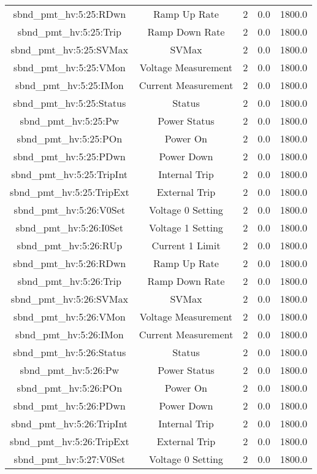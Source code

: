 \begin{center}
\begin{longtable}{c | c c c c }
sbnd\_pmt\_hv:5:25:RDwn & Ramp Up Rate & 2 & 0.0 & 1800.0\\ 
sbnd\_pmt\_hv:5:25:Trip & Ramp Down Rate & 2 & 0.0 & 1800.0\\ 
sbnd\_pmt\_hv:5:25:SVMax & SVMax & 2 & 0.0 & 1800.0\\ 
sbnd\_pmt\_hv:5:25:VMon & Voltage Measurement & 2 & 0.0 & 1800.0\\ 
sbnd\_pmt\_hv:5:25:IMon & Current Measurement & 2 & 0.0 & 1800.0\\ 
sbnd\_pmt\_hv:5:25:Status & Status & 2 & 0.0 & 1800.0\\ 
sbnd\_pmt\_hv:5:25:Pw & Power Status & 2 & 0.0 & 1800.0\\ 
sbnd\_pmt\_hv:5:25:POn & Power On & 2 & 0.0 & 1800.0\\ 
sbnd\_pmt\_hv:5:25:PDwn & Power Down & 2 & 0.0 & 1800.0\\ 
sbnd\_pmt\_hv:5:25:TripInt & Internal Trip & 2 & 0.0 & 1800.0\\ 
sbnd\_pmt\_hv:5:25:TripExt & External Trip & 2 & 0.0 & 1800.0\\ 
sbnd\_pmt\_hv:5:26:V0Set & Voltage 0 Setting & 2 & 0.0 & 1800.0\\ 
sbnd\_pmt\_hv:5:26:I0Set & Voltage 1 Setting & 2 & 0.0 & 1800.0\\ 
sbnd\_pmt\_hv:5:26:RUp & Current 1 Limit & 2 & 0.0 & 1800.0\\ 
sbnd\_pmt\_hv:5:26:RDwn & Ramp Up Rate & 2 & 0.0 & 1800.0\\ 
sbnd\_pmt\_hv:5:26:Trip & Ramp Down Rate & 2 & 0.0 & 1800.0\\ 
sbnd\_pmt\_hv:5:26:SVMax & SVMax & 2 & 0.0 & 1800.0\\ 
sbnd\_pmt\_hv:5:26:VMon & Voltage Measurement & 2 & 0.0 & 1800.0\\ 
sbnd\_pmt\_hv:5:26:IMon & Current Measurement & 2 & 0.0 & 1800.0\\ 
sbnd\_pmt\_hv:5:26:Status & Status & 2 & 0.0 & 1800.0\\ 
sbnd\_pmt\_hv:5:26:Pw & Power Status & 2 & 0.0 & 1800.0\\ 
sbnd\_pmt\_hv:5:26:POn & Power On & 2 & 0.0 & 1800.0\\ 
sbnd\_pmt\_hv:5:26:PDwn & Power Down & 2 & 0.0 & 1800.0\\ 
sbnd\_pmt\_hv:5:26:TripInt & Internal Trip & 2 & 0.0 & 1800.0\\ 
sbnd\_pmt\_hv:5:26:TripExt & External Trip & 2 & 0.0 & 1800.0\\ 
sbnd\_pmt\_hv:5:27:V0Set & Voltage 0 Setting & 2 & 0.0 & 1800.0\\ 

\end{longtable}
\end{center}
